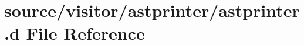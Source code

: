 \hypertarget{astprinter_8d}{\section{source/visitor/astprinter/astprinter.d File Reference}
\label{astprinter_8d}
}
